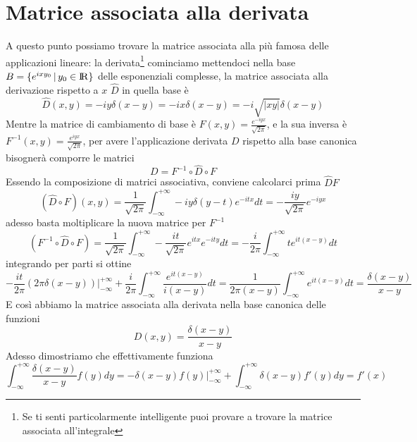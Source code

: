 \documentclass[11pt,a4paper]{article}
\theoremstyle{definition}
\theoremstyle{plain}
\theoremstyle{plain}
\begin{document}
	\section{Matrice associata alla derivata}
		A questo punto possiamo trovare la matrice associata alla più famosa delle applicazioni lineare: la derivata\footnote{Se ti senti particolarmente intelligente puoi provare a trovare la matrice associata all'integrale}\newline
		cominciamo mettendoci nella base $B=\{e^{ixy_0}\,|\,y_0 \in \rm I\!R \}$ delle esponenziali complesse, la matrice associata alla derivazione rispetto a $x$ $\widehat{D}$ in quella base è 
		\begin{equation}
			\widehat{D}(x,y)=-iy\delta (x-y)=-ix\delta(x-y)=-i\sqrt{|xy|}\delta(x-y)
		\end{equation}
		Mentre la matrice di cambiamento di base è $F(x,y)=\frac{e^{-iyx}}{\sqrt{2\pi}}$, e la sua inversa è $F^{-1}(x,y)=\frac{e^{iyx}}{\sqrt{2\pi}}$, per avere l'applicazione derivata $D$ rispetto alla base canonica bisognerà comporre le matrici
		\begin{equation}
			D=F^{-1}\circ \widehat{D}\circ F
		\end{equation}
		Essendo la composizione di matrici associativa, conviene calcolarci prima $\widehat{D}F$
		\[
			(\widehat{D}\circ F)(x,y)=\frac{1}{\sqrt{2\pi}}\int_{-\infty}^{+\infty}
			-iy\delta(y-t)e^{-itx}dt=-\frac{iy}{\sqrt{2\pi}}e^{-iyx}
		\]
		adesso basta moltiplicare la nuova matrice per $F^{-1}$
		\[
			(F^{-1}\circ \widehat{D}\circ F)=
			\frac{1}{\sqrt{2\pi}}\int_{-\infty}^{+\infty}-\frac{it}{\sqrt{2\pi}}e^{itx}e^{-ity}dt=
			-\frac{i}{2\pi}\int_{-\infty}^{+\infty}te^{it(x-y)}dt
		\]
		integrando per parti si ottine
		\[
			-\frac{it}{2\pi}(2\pi\delta(x-y))\bigg\rvert_{-\infty}^{+\infty}+
			\frac{i}{2\pi}\int_{-\infty}^{+\infty}\frac{e^{it(x-y)}}{i(x-y)}dt=
			\frac{1}{2\pi(x-y)}\int_{-\infty}^{+\infty}e^{it(x-y)}dt=\frac{\delta(x-y)}{x-y}
		\]
		E così abbiamo la matrice associata alla derivata nella base canonica delle funzioni
		\begin{equation}
			D(x,y)=\frac{\delta(x-y)}{x-y}
		\end{equation}
		Adesso dimostriamo che effettivamente funziona
		\[
			\int_{-\infty}^{+\infty}\frac{\delta(x-y)}{x-y}f(y)dy=-\delta(x-y)f(y)\big\rvert_{-\infty}^{+\infty}+\int_{-\infty}^{+\infty}\delta(x-y)f'(y)dy=f'(x)
		\]
\end{document}
